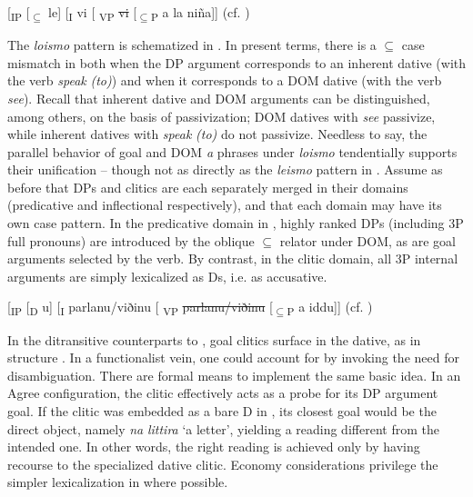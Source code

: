 \documentclass[output=paper,colorlinks,citecolor=brown,nonflat]{./langscibook}
\begin{document}
\ea%
    \label{ex:manzini:25}{}
    [\textsubscript{IP} [\textsubscript{${\subseteq}$} le]  [\textsubscript{I} vi   [\textsubscript{ VP} \sout{vi}  [\textsubscript{${\subseteq}$P} a la niña]]    \hfill (cf. )\\
\z

The \textit{loismo} pattern is schematized in . In present terms, there is a ${\subseteq}$ case mismatch in  both when the DP argument corresponds to an inherent dative (with the verb \textit{speak} \textit{(to)}) and when it corresponds to a DOM dative (with the verb \textit{see}). Recall that inherent dative and DOM arguments can be distinguished, among others, on the basis of passivization; DOM datives with \textit{see} passivize, while inherent datives with \textit{speak} \textit{(to)} do not passivize. Needless to say, the parallel behavior of goal and DOM \textit{a} phrases under \textit{loismo} tendentially supports their unification – though not as directly as the \textit{leismo} pattern in . Assume as before that DPs and clitics are each separately merged in their domains (predicative and inflectional respectively), and that each domain may have its own case pattern. In the predicative domain in , highly ranked DPs (including 3P full pronouns) are introduced by the oblique ${\subseteq}$ relator under DOM, as are goal arguments selected by the verb. By contrast, in the clitic domain, all 3P internal arguments are simply lexicalized as Ds, i.e. as accusative.

\ea%
    \label{ex:manzini:26}{}
    [\textsubscript{IP} [\textsubscript{D} u] [\textsubscript{I} parlanu/viðinu   [\textsubscript{ VP} \sout{parlanu/viðinu}  [\textsubscript{${\subseteq}$P} a iddu]]              \hfill (cf. )
\z

In the ditransitive counterparts to , goal clitics surface in the dative, as in structure . In a functionalist vein, one could account for  by invoking the need for disambiguation. There are formal means to implement the same basic idea. In an Agree configuration, the clitic effectively acts as a probe for its DP argument goal. If the clitic was embedded as a bare D in , its closest goal would be the direct object, namely \textit{na} \textit{littira} ‘a letter’, yielding a reading different from the intended one. In other words, the right reading is achieved only by having recourse to the specialized dative clitic. Economy considerations privilege the simpler lexicalization in  where possible.
\end{document}
